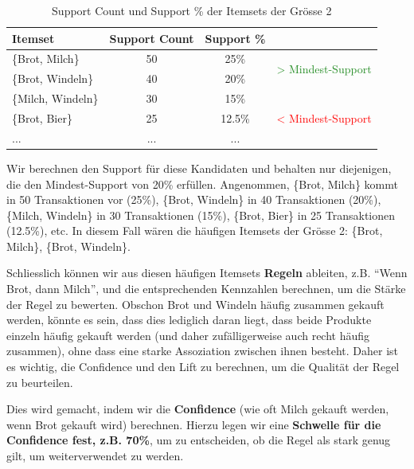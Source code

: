 \begin{myexample}
    \begin{table}[H]
        \centering
        \begin{tabular}{l|c|c|l}
            Itemset            & Support Count & Support \% &                                                             \\
            \midrule
            \{Brot, Milch\}    & 50            & 25\%       & \multirow{2}{*}{\textcolor{ForestGreen}{> Mindest-Support}} \\
            \{Brot, Windeln\}  & 40            & 20\%       &                                                             \\\midrule\midrule
            \{Milch, Windeln\} & 30            & 15\%       & \multirow{3}{*}{\textcolor{red}{< Mindest-Support}}         \\
            \{Brot, Bier\}     & 25            & 12.5\%     &                                                             \\
            ...                & ...           & ...        &                                                             \\
        \end{tabular}
        \caption{Support Count und Support \% der Itemsets der Grösse 2}
    \end{table}

    Wir berechnen den Support für diese Kandidaten und behalten nur diejenigen, die den Mindest-Support von 20\% erfüllen. Angenommen, \{Brot, Milch\} kommt in 50 Transaktionen vor (25\%), \{Brot, Windeln\} in 40 Transaktionen (20\%), \{Milch, Windeln\} in 30 Transaktionen (15\%), \{Brot, Bier\} in 25 Transaktionen (12.5\%), etc. In diesem Fall wären die häufigen Itemsets der Grösse 2: \{Brot, Milch\}, \{Brot, Windeln\}.

    Schliesslich können wir aus diesen häufigen Itemsets \textbf{Regeln} ableiten, z.B. \enquote{Wenn Brot, dann Milch}, und die entsprechenden Kennzahlen berechnen, um die Stärke der Regel zu bewerten. Obschon Brot und Windeln häufig zusammen gekauft werden, könnte es sein, dass dies lediglich daran liegt, dass beide Produkte einzeln häufig gekauft werden (und daher zufälligerweise auch recht häufig zusammen), ohne dass eine starke Assoziation zwischen ihnen besteht. Daher ist es wichtig, die Confidence und den Lift zu berechnen, um die Qualität der Regel zu beurteilen.

    Dies wird gemacht, indem wir die \textbf{Confidence} (wie oft Milch gekauft werden, wenn Brot gekauft wird) berechnen. Hierzu legen wir eine \textbf{Schwelle für die Confidence fest, z.B. 70\%}, um zu entscheiden, ob die Regel als stark genug gilt, um weiterverwendet zu werden.


\end{myexample}
